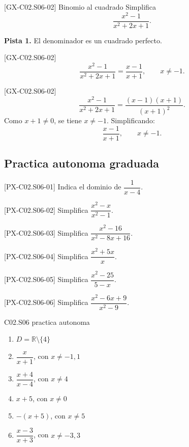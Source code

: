 \begin{guidedexercise}{[GX-C02.S06-02] Binomio al cuadrado}
Simplifica
\[
\frac{x^2-1}{x^2+2x+1}.
\]

\textbf{Pista 1.} El denominador es un cuadrado perfecto.
\end{guidedexercise}

\begin{shortanswer}{[GX-C02.S06-02]}
\[
\frac{x^2-1}{x^2+2x+1}=\frac{x-1}{x+1},\qquad x\neq -1.
\]
\end{shortanswer}

\begin{fullsolution}{[GX-C02.S06-02]}
\[
\frac{x^2-1}{x^2+2x+1}=\frac{(x-1)(x+1)}{(x+1)^2}.
\]
Como \(x+1\neq 0\), se tiene \(x\neq -1\). Simplificando:
\[
\frac{x-1}{x+1},\qquad x\neq -1.
\]
\end{fullsolution}

\subsection*{Practica autonoma graduada}
\begin{exercise}{[PX-C02.S06-01] Indica el dominio de \(\dfrac{1}{x-4}\).}
\end{exercise}
\begin{exercise}{[PX-C02.S06-02] Simplifica \(\dfrac{x^2-x}{x^2-1}\).}
\end{exercise}
\begin{exercise}{[PX-C02.S06-03] Simplifica \(\dfrac{x^2-16}{x^2-8x+16}\).}
\end{exercise}
\begin{exercise}{[PX-C02.S06-04] Simplifica \(\dfrac{x^2+5x}{x}\).}
\end{exercise}
\begin{exercise}{[PX-C02.S06-05] Simplifica \(\dfrac{x^2-25}{5-x}\).}
\end{exercise}
\begin{exercise}{[PX-C02.S06-06] Simplifica \(\dfrac{x^2-6x+9}{x^2-9}\).}
\end{exercise}

\begin{shortanswer}{C02.S06 practica autonoma}
\begin{enumerate}[label=\textbf{PX-C02.S06-\arabic*:}, leftmargin=*]
  \item \(D=\mathbb{R}\setminus\{4\}\)
  \item \(\dfrac{x}{x+1}\), con \(x\neq -1,1\)
  \item \(\dfrac{x+4}{x-4}\), con \(x\neq 4\)
  \item \(x+5\), con \(x\neq 0\)
  \item \(-(x+5)\), con \(x\neq 5\)
  \item \(\dfrac{x-3}{x+3}\), con \(x\neq -3,3\)
\end{enumerate}
\end{shortanswer}

